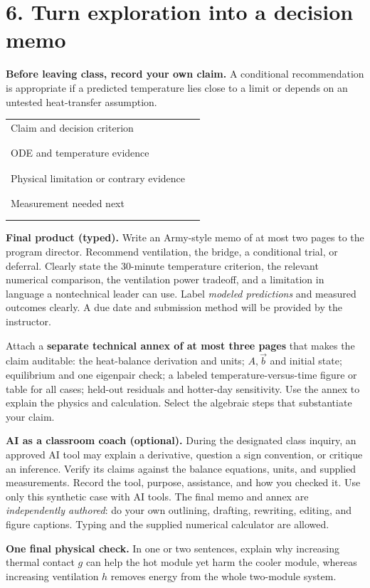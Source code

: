 \documentclass[10pt,letterpaper]{article}
\newcommand{\work}[1]{\vspace{#1}}
\begin{document}
\newpage
\section*{6. Turn exploration into a decision memo}
\textbf{Before leaving class, record your own claim.} A conditional recommendation is appropriate if a predicted temperature lies close to a limit or depends on an untested heat-transfer assumption.
\begin{center}
\begin{tabularx}{\linewidth}{@{}p{1.82in}Y@{}}
\toprule
Claim and decision criterion & \rule{0pt}{0.43in}\\
\\
\\
\midrule
ODE and temperature evidence & \rule{0pt}{0.55in}\\
\\
\\
\midrule
Physical limitation or contrary evidence & \rule{0pt}{0.55in}\\
\\
\\
\midrule
Measurement needed next & \rule{0pt}{0.45in}\\
\\
\\
\bottomrule
\end{tabularx}
\end{center}

\textbf{Final product (typed).} Write an Army-style memo of at most two pages to the program director. Recommend ventilation, the bridge, a conditional trial, or deferral. Clearly state the 30-minute temperature criterion, the relevant numerical comparison, the ventilation power tradeoff, and a limitation in language a nontechnical leader can use. Label \emph{modeled predictions} and measured outcomes clearly. A due date and submission method will be provided by the instructor.

Attach a \textbf{separate technical annex of at most three pages} that makes the claim auditable: the heat-balance derivation and units; $A,\vec b$ and initial state; equilibrium and one eigenpair check; a labeled temperature-versus-time figure or table for all cases; held-out residuals and hotter-day sensitivity. Use the annex to explain the physics and calculation. Select the algebraic steps that substantiate your claim.

\textbf{AI as a classroom coach (optional).} During the designated class inquiry, an approved AI tool may explain a derivative, question a sign convention, or critique an inference. Verify its claims against the balance equations, units, and supplied measurements. Record the tool, purpose, assistance, and how you checked it. Use only this synthetic case with AI tools. The final memo and annex are \emph{independently authored}: do your own outlining, drafting, rewriting, editing, and figure captions. Typing and the supplied numerical calculator are allowed.

\textbf{One final physical check.} In one or two sentences, explain why increasing thermal contact $g$ can help the hot module yet harm the cooler module, whereas increasing ventilation $h$ removes energy from the whole two-module system.\work{0.58in}
\end{document}

